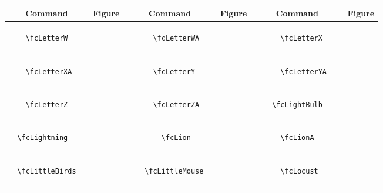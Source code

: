 \documentclass[x11names]{article}
\begin{document}
\begin{table}[H]\centering\begin{tabular}{|c|c|c|c|c|c|}\hline{\bf Command} & {\bf Figure} & {\bf Command} & {\bf Figure} & {\bf Command} & {\bf Figure}\\	\hline	&\multirow{5}{*}{	\fcLetterW	[scale=0.4]} & &\multirow{5}{*}{	\fcLetterWA	[scale=0.4]} & &\multirow{5}{*}{	\fcLetterX	[scale=0.4]}\\	& & & & & \\	& & & & & \\	\verb|	\fcLetterW	| & & \verb|	\fcLetterWA	| & & \verb|	\fcLetterX	| & \\	& & & & & \\	& & & & & \\	& & & & & \\	\hline									
		&\multirow{5}{*}{	\fcLetterXA	[scale=0.4]} & &\multirow{5}{*}{	\fcLetterY	[scale=0.4]} & &\multirow{5}{*}{	\fcLetterYA	[scale=0.4]}\\	& & & & & \\	& & & & & \\	\verb|	\fcLetterXA	| & & \verb|	\fcLetterY	| & & \verb|	\fcLetterYA	| & \\	& & & & & \\	& & & & & \\	& & & & & \\	\hline									
		&\multirow{5}{*}{	\fcLetterZ	[scale=0.4]} & &\multirow{5}{*}{	\fcLetterZA	[scale=0.4]} & &\multirow{5}{*}{	\fcLightBulb	[scale=0.4]}\\	& & & & & \\	& & & & & \\	\verb|	\fcLetterZ	| & & \verb|	\fcLetterZA	| & & \verb|	\fcLightBulb	| & \\	& & & & & \\	& & & & & \\	& & & & & \\	\hline									
		&\multirow{5}{*}{	\fcLightning	[scale=0.4]} & &\multirow{5}{*}{	\fcLion	[scale=0.8]} & &\multirow{5}{*}{	\fcLionA	[scale=0.4]}\\	& & & & & \\	& & & & & \\	\verb|	\fcLightning	| & & \verb|	\fcLion	| & & \verb|	\fcLionA	| & \\	& & & & & \\	& & & & & \\	& & & & & \\	\hline									
		&\multirow{5}{*}{	\fcLittleBirds	[scale=0.4]} & &\multirow{5}{*}{	\fcLittleMouse	[scale=0.4]} & &\multirow{5}{*}{	\fcLocust	[scale=0.4]}\\	& & & & & \\	& & & & & \\	\verb|	\fcLittleBirds	| & & \verb|	\fcLittleMouse	| & & \verb|	\fcLocust	| & \\	& & & & & \\	& & & & & \\	& & & & & \\	\hline									

\end{tabular}
\end{table}
\end{document}
